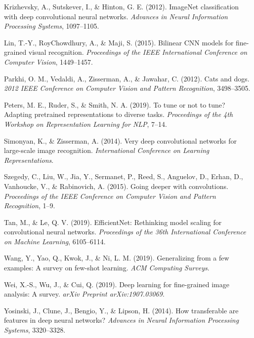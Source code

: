 \documentclass[
]{article}
\newlength{\cslhangindent}
\newenvironment{CSLReferences}[2] %
 {\begin{list}{}{%
  \setlength{\itemindent}{0pt}
  \setlength{\leftmargin}{0pt}
  \setlength{\parsep}{0pt}
  \ifodd #1
   \setlength{\leftmargin}{\cslhangindent}
   \setlength{\itemindent}{-1\cslhangindent}
  \fi
  \setlength{\itemsep}{#2\baselineskip}}}
 {\end{list}}
\begin{document}
\begin{CSLReferences}{1}{0}
Krizhevsky, A., Sutskever, I., \& Hinton, G. E. (2012). ImageNet
classification with deep convolutional neural networks. \emph{Advances
in Neural Information Processing Systems}, 1097--1105.

Lin, T.-Y., RoyChowdhury, A., \& Maji, S. (2015). Bilinear CNN models
for fine-grained visual recognition. \emph{Proceedings of the IEEE
International Conference on Computer Vision}, 1449--1457.

Parkhi, O. M., Vedaldi, A., Zisserman, A., \& Jawahar, C. (2012). Cats
and dogs. \emph{2012 IEEE Conference on Computer Vision and Pattern
Recognition}, 3498--3505.

Peters, M. E., Ruder, S., \& Smith, N. A. (2019). To tune or not to
tune? Adapting pretrained representations to diverse tasks.
\emph{Proceedings of the 4th Workshop on Representation Learning for
NLP}, 7--14.

Simonyan, K., \& Zisserman, A. (2014). Very deep convolutional networks
for large-scale image recognition. \emph{International Conference on
Learning Representations}.

Szegedy, C., Liu, W., Jia, Y., Sermanet, P., Reed, S., Anguelov, D.,
Erhan, D., Vanhoucke, V., \& Rabinovich, A. (2015). Going deeper with
convolutions. \emph{Proceedings of the IEEE Conference on Computer
Vision and Pattern Recognition}, 1--9.

Tan, M., \& Le, Q. V. (2019). EfficientNet: Rethinking model scaling for
convolutional neural networks. \emph{Proceedings of the 36th
International Conference on Machine Learning}, 6105--6114.

Wang, Y., Yao, Q., Kwok, J., \& Ni, L. M. (2019). Generalizing from a
few examples: A survey on few-shot learning. \emph{ACM Computing
Surveys}.

Wei, X.-S., Wu, J., \& Cui, Q. (2019). Deep learning for fine-grained
image analysis: A survey. \emph{arXiv Preprint arXiv:1907.03069}.

Yosinski, J., Clune, J., Bengio, Y., \& Lipson, H. (2014). How
transferable are features in deep neural networks? \emph{Advances in
Neural Information Processing Systems}, 3320--3328.


\end{CSLReferences}
\end{document}
